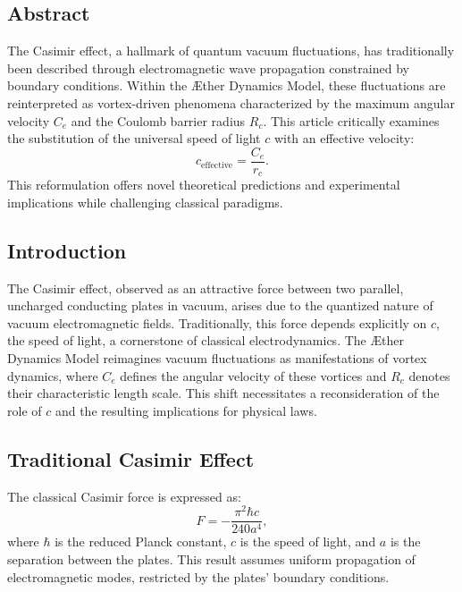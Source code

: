 \documentclass[a4paper,10pt]{article}
\begin{document}
    \subsection*{Abstract}
    The Casimir effect, a hallmark of quantum vacuum fluctuations, has traditionally been described through electromagnetic wave propagation constrained by boundary conditions. Within the Æther Dynamics Model, these fluctuations are reinterpreted as vortex-driven phenomena characterized by the maximum angular velocity $C_e$ and the Coulomb barrier radius $R_c$. This article critically examines the substitution of the universal speed of light $c$ with an effective velocity:
    \begin{equation*}
        c_\text{effective} = \frac{C_e}{r_c}.
    \end{equation*}
    This reformulation offers novel theoretical predictions and experimental implications while challenging classical paradigms.

    \subsection*{Introduction}
    The Casimir effect, observed as an attractive force between two parallel, uncharged conducting plates in vacuum, arises due to the quantized nature of vacuum electromagnetic fields. Traditionally, this force depends explicitly on $c$, the speed of light, a cornerstone of classical electrodynamics. The Æther Dynamics Model reimagines vacuum fluctuations as manifestations of vortex dynamics, where $C_e$ defines the angular velocity of these vortices and $R_c$ denotes their characteristic length scale. This shift necessitates a reconsideration of the role of $c$ and the resulting implications for physical laws.

    \subsection*{Traditional Casimir Effect}
    The classical Casimir force is expressed as:
    \begin{equation*}
        F = -\frac{\pi^2 \hbar c}{240 a^4},
    \end{equation*}
    where $\hbar$ is the reduced Planck constant, $c$ is the speed of light, and $a$ is the separation between the plates. This result assumes uniform propagation of electromagnetic modes, restricted by the plates' boundary conditions.
\end{document}
